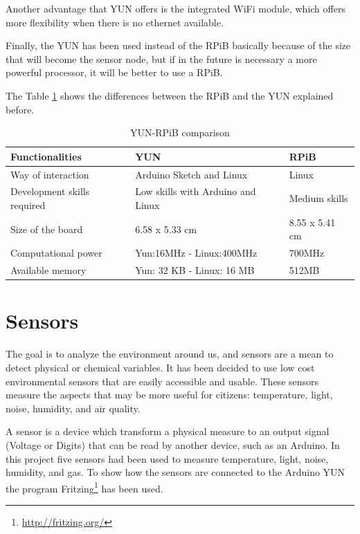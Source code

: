 \documentclass[12pt, a4paper,twoside]{tesi_upf}
\begin{document}
    Another advantage that YUN offers is the integrated WiFi module, which offers more flexibility when there is no ethernet available.
    
    Finally, the YUN has been used instead of the RPiB basically because of the size that will become the sensor node, but if in the future is necessary a more powerful processor, it will be better to use a RPiB.
    
    The Table \ref{tab:YUN-RPiBcomparisonfig:sensorboards} shows the differences between the RPiB and the YUN explained before.
    
    \begin{table}
    	\centering
		  \begin{tabular}{ | l | p{6cm} | p{3cm} |}
				\hline
				{\bf Functionalities} & {\bf YUN} & {\bf RPiB} \\ \hline
				Way of interaction & Arduino Sketch and Linux & Linux \\ \hline
				Development skills required & Low skills with Arduino and Linux & Medium skills \\ \hline
				Size of the board & 6.58 x 5.33 cm & 8.55 x 5.41 cm \\ \hline
				Computational power & Yun:16MHz - Linux:400MHz & 700MHz \\ \hline
				Available memory & Yun: 32 KB - Linux: 16 MB & 512MB \\ \hline
		  \end{tabular}
      \caption{YUN-RPiB comparison}
      \label{tab:YUN-RPiBcomparisonfig:sensorboards}
		\end{table}

  \section{Sensors}
    The goal is to analyze the environment around us, and sensors are a mean to detect physical or chemical variables. It has been decided to use low cost environmental sensors that are easily accessible and usable. 
    These sensors measure the aspects that may be more useful for citizens: temperature, light, noise, humidity, and air quality.
    
    A sensor is a device which transform a physical measure to an output signal (Voltage or Digits) that can be read by another device, such as an Arduino.
    In this project five sensors had been used to measure temperature, light, noise, humidity, and gas.
    To show how the sensors are connected to the Arduino YUN the program Fritzing\footnote{\url{http://fritzing.org/}} has been used.
    
\end{document}
